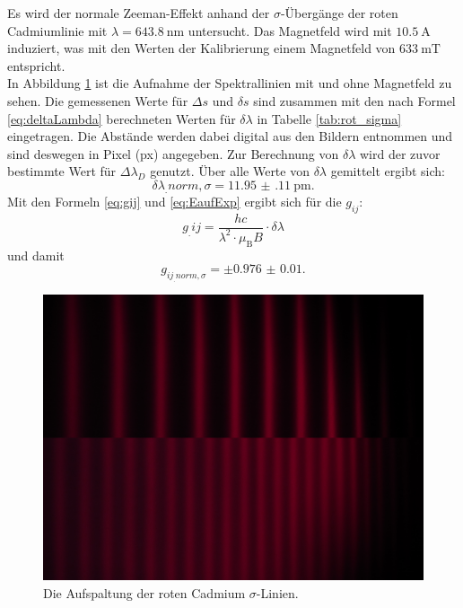 Es wird der normale Zeeman-Effekt anhand der $\sigma$-Übergänge der roten Cadmiumlinie mit $\lambda=\SI{643.8}{\nano\metre}$ untersucht. Das Magnetfeld wird mit $\SI{10.5}{\ampere}$ induziert, was mit den Werten der Kalibrierung einem Magnetfeld von $\SI{633}{\milli\tesla}$ entspricht.\\
In Abbildung \ref{fig:rot_sigma} ist die Aufnahme der Spektrallinien mit und ohne Magnetfeld zu sehen. Die gemessenen Werte für $\Delta s$ und $\delta s$ sind zusammen mit den nach Formel \eqref{eq:deltaLambda} berechneten Werten für $\delta\lambda$ in Tabelle \ref{tab:rot_sigma} eingetragen. Die Abstände werden dabei digital aus den Bildern entnommen und sind deswegen in Pixel (px) angegeben. Zur Berechnung von $\delta\lambda$ wird der zuvor bestimmte Wert für $\Delta\lambda_D$ genutzt.
Über alle Werte von $\delta\lambda$ gemittelt ergibt sich:
\[
\delta\lambda_.{norm,\sigma} = \SI{11.95(11)}{\pico\metre}\text{.}
\]
Mit den Formeln \eqref{eq:gij} und \eqref{eq:EaufExp} ergibt sich für die $g_{ij}$:
\begin{equation}
g_.{ij}=\frac{h c}{\lambda^2 \cdot \mu_\text{B} B} \cdot \delta \lambda \label{eq:exgj}
\end{equation}
und damit
\[
g_{ij_.{norm,\sigma}} = \pm\num{0.976(10)}\text{.}
\]

\begin{figure}
	\centering
	\includegraphics[width=\linewidth-130pt,height=\textheight-130pt,keepaspectratio]{content/images/rot_sigma.jpg}
	\caption{Die Aufspaltung der roten Cadmium $\sigma$-Linien.}
	\label{fig:rot_sigma}
\end{figure}

